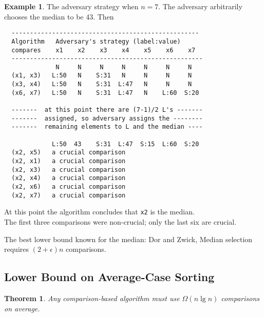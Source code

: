 \documentclass[12pt]{article}
\theoremstyle{plain}
\newtheorem{theorem}{Theorem}[subsection]
\theoremstyle{definition}
\newtheorem*{ex*}{Example}
\begin{document}
\begin{ex*}
The adversary strategy when $n = 7$.
The adversary arbitrarily chooses the median to be 43.
Then
\begin{verbatim}
  ---------------------------------------------------
  Algorithm   Adversary's strategy (label:value)
  compares    x1    x2    x3    x4    x5    x6    x7
  ----------------------------------------------------
              N     N     N     N     N     N     N
  (x1, x3)   L:50   N    S:31   N     N     N     N
  (x3, x4)   L:50   N    S:31  L:47   N     N     N
  (x6, x7)   L:50   N    S:31  L:47   N    L:60  S:20

  -------  at this point there are (7-1)/2 L's -------
  -------  assigned, so adversary assigns the --------
  -------  remaining elements to L and the median ----

             L:50  43    S:31  L:47  S:15  L:60  S:20
  (x2, x5)   a crucial comparison
  (x2, x1)   a crucial comparison
  (x2, x3)   a crucial comparison
  (x2, x4)   a crucial comparison
  (x2, x6)   a crucial comparison
  (x2, x7)   a crucial comparison
\end{verbatim}
At this point the algorithm concludes that \texttt{x2} is the median. \\
The first three comparisons were non-crucial; only the last six are crucial.
\end{ex*}

The best lower bound known for the median: Dor and Zwick, Median selection requires $(2 + \epsilon)n$ comparisons.

\subsection{Lower Bound on Average-Case Sorting}
\begin{theorem}
Any comparison-based algorithm must use $\Omega(n \lg n)$ comparisons on \emph{average}.
\end{theorem}
\end{document}
